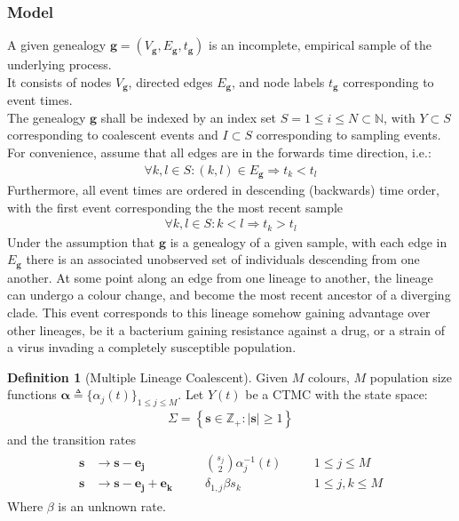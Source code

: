 \documentclass{ieeeaccess}
\newcommand{\N}{\mathbb{N}}
\newcommand{\Z}{\mathbb{Z}}
\theoremstyle{definition}
\newtheorem{definition}{Definition}[section]
\begin{document}
\subsubsection{Model}
A given genealogy $\mathbf{g}=(V_\mathbf{g}, E_\mathbf{g}, t_\mathbf{g})$ is an incomplete, empirical sample of the underlying process.\\
It consists of nodes $V_\mathbf{g}$, directed edges $E_\mathbf{g}$, and node labels $t_\mathbf{g}$ corresponding to event times.\\
The genealogy $\mathbf{g}$ shall be indexed by an index set $S=1\leq i \leq N\subset \N$, with $Y\subset S$ corresponding to coalescent events and $I\subset S$ corresponding to sampling events.\\
For convenience, assume that all edges are in the forwards time direction, i.e.: 
\begin{gather*}
\forall k,l \in S: (k,l)\in E_\mathbf{g} \Rightarrow t_k<t_l
\end{gather*}
Furthermore, all event times are ordered in descending (backwards) time order, with the first event corresponding the the most recent sample
\begin{gather*}
\forall k,l \in S: k<l \Rightarrow t_k > t_l
\end{gather*}
Under the assumption that $\mathbf{g}$ is a genealogy of a given sample, with each edge in $E_\mathbf{g}$ there is an associated unobserved set of individuals descending from one another. At some point along an edge from one lineage to another, the lineage can undergo a colour change, and become the most recent ancestor of a diverging clade. This event corresponds to this lineage somehow gaining advantage over other lineages, be it a bacterium gaining resistance against a drug, or a strain of a virus invading a completely susceptible population.
\begin{definition}[Multiple Lineage Coalescent]\label{def:model}
Given $M$ colours, $M$ population size functions $\mathbf{\alpha}\triangleq\{\alpha_j(t)\}_{1\leq j\leq M}$. Let $Y(t)$ be a CTMC with the state space:
\begin{gather}
  \Sigma = \left\{\mathbf{s}\in \Z_+: |\mathbf{s}|\geq1\right\}
\end{gather}
and the transition rates
\begin{gather}\label{eq:multirate}
\begin{align}
\mathbf{s}&\to\mathbf{s}-\mathbf{e_j} &\quad& \binom{s_j}{2}\alpha_j^{-1}(t)&\quad&1\leq j\leq M\\
\mathbf{s}&\to\mathbf{s}-\mathbf{e_j}+\mathbf{e_k}&\quad& \delta_{1,j}\beta s_k&\quad&1\leq j,k\leq M
\end{align}
\end{gather}
Where $\beta$ is an unknown rate.
\end{definition}
\end{document}
